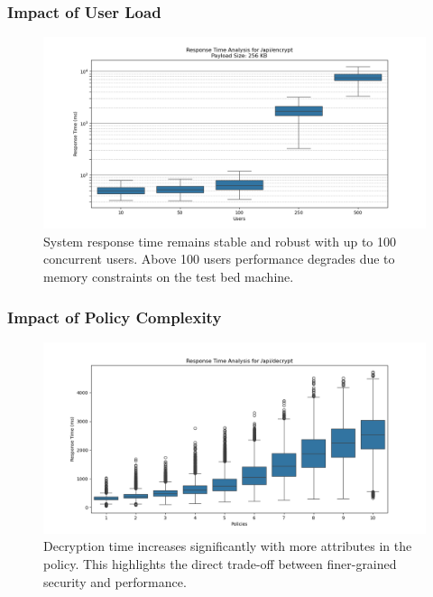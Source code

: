 \documentclass{beamer}
\begin{document}
\begin{frame}
\frametitle{Impact of User Load}
\begin{figure}
\includegraphics[width=\textwidth,height=0.75\textheight,keepaspectratio]{images/phase3/response_time_api_encrypt_256KB.png}
\caption{System response time remains stable and robust with up to 100 concurrent users. Above 100 users performance degrades due to memory constraints on the test bed machine.}
\end{figure}
\end{frame}

\begin{frame}
\frametitle{Impact of Policy Complexity}
\begin{figure}
\includegraphics[width=\textwidth,height=0.75\textheight,keepaspectratio]{images/phase4/response_time_api_decrypt.png}
\caption{Decryption time increases significantly with more attributes in the policy. This highlights the direct trade-off between finer-grained security and performance.}
\end{figure}
\end{frame}
\end{document}
